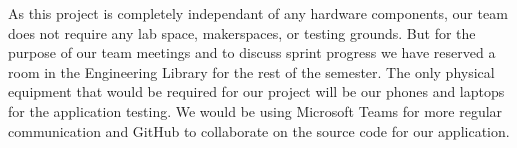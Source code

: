 As this project is completely independant of any hardware components, our team does not require any lab space, makerspaces, or testing grounds. But for the purpose of our team meetings and to discuss sprint progress we have reserved a room in the Engineering Library for the rest of the semester. The only physical equipment that would be required for our project will be our phones and laptops for the application testing. We would be using Microsoft Teams for more regular communication and GitHub to collaborate on the source code for our application.
